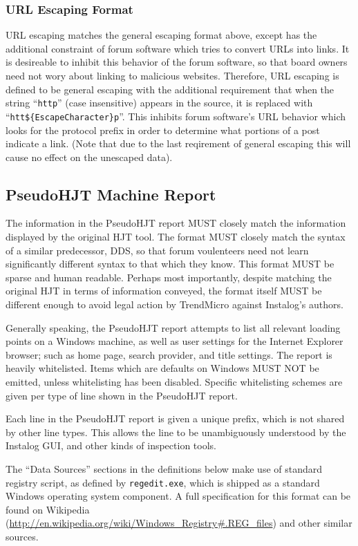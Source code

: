 \documentclass[letterpaper,12pt]{article}
\newcommand{\var}[1]{\texttt{\$\{#1\}}}
\begin{document}
\subsubsection{URL Escaping Format} \label{urlescape}
URL escaping matches the general escaping format above, except has the
additional constraint of forum software which tries to convert URLs into links.
It is desireable to inhibit this behavior of the forum software, so that board
owners need not wory about linking to malicious websites. Therefore, URL
escaping is defined to be general escaping with the additional requirement that
when the string ``\texttt{http}'' (case insensitive) appears in the source, it
is replaced with ``\texttt{htt}\var{EscapeCharacter}\texttt{p}''. This inhibits
forum software's URL behavior which looks for the protocol prefix in order to
determine what portions of a post indicate a link. (Note that due to the last
reqirement of general escaping this will cause no effect on the unescaped data).

\subsection{PseudoHJT Machine Report}
The information in the PseudoHJT report MUST closely match the information
displayed by the original HJT tool. The format MUST closely match the syntax of
a similar predecessor, DDS, so that forum voulenteers need not learn
significantly different syntax to that which they know. This format MUST be
sparse and human readable. Perhaps most importantly, despite matching the
original HJT in terms of information conveyed, the format itself MUST be
different enough to avoid legal action by TrendMicro against Instalog's authors.

Generally speaking, the PseudoHJT report attempts to list all relevant loading
points on a Windows machine, as well as user settings for the Internet Explorer
browser; such as home page, search provider, and title settings. The report is
heavily whitelisted. Items which are defaults on Windows MUST NOT be emitted,
unless whitelisting has been disabled. Specific whitelisting schemes are given
per type of line shown in the PseudoHJT report.

Each line in the PseudoHJT report is given a unique prefix, which is not shared
by other line types. This allows the line to be unambiguously understood by the
Instalog GUI, and other kinds of inspection tools.

The ``Data Sources'' sections in the definitions below make use of standard
registry script, as defined by \verb|regedit.exe|, which is shipped as a
standard Windows operating system component. A full specification for this
format can be found on Wikipedia
(\url{http://en.wikipedia.org/wiki/Windows_Registry#.REG_files}) and other
similar sources.
\end{document}
